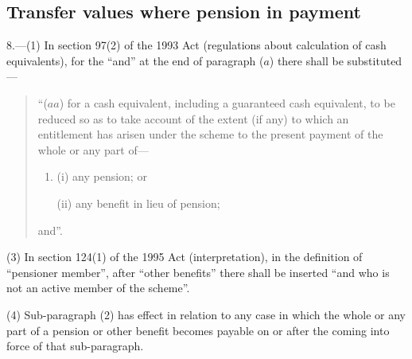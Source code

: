 \documentclass[12pt,a4paper]{article}
\begin{document}

\subsection*{Transfer values where pension in payment}

8.---(1) In section 97(2)  of the 1993 Act (regulations about calculation of cash equivalents), for the “and” at the end of paragraph ($a$)  there shall be substituted—
\begin{quotation}
“($aa$) for a cash equivalent, including a guaranteed cash equivalent, to be reduced so as to take account of the extent (if any) to which an entitlement has arisen under the scheme to the present payment of the whole or any part of—
\begin{enumerate}\item[]
(i) any pension; or

(ii) any benefit in lieu of pension;
\end{enumerate}
and”.
\end{quotation}

%
%

(3) In section 124(1)  of the 1995 Act (interpretation), in the definition of “pensioner member”, after “other benefits” there shall be inserted “and who is not an active member of the scheme”.

(4) Sub-paragraph (2)  has effect in relation to any case in which the whole or any part of a pension or other benefit becomes payable on or after the coming into force of that sub-paragraph.

\end{document}
